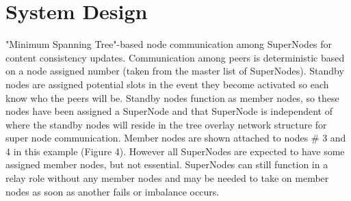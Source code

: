 \documentclass[oneside,12pt]{memoir}
\begin{document}
\section{System Design}
\label{sysd}

"Minimum Spanning Tree"-based node communication among SuperNodes for content consistency updates.  Communication among peers is deterministic based on a node assigned number (taken from the master list of SuperNodes).     Standby nodes are assigned potential slots in the event they become activated so each know who the peers will be.  Standby nodes function as member nodes, so these nodes have been assigned a SuperNode and that SuperNode is independent of where the standby nodes will reside in the tree overlay network structure for super node communication.  Member nodes are shown attached to nodes \# 3 and 4 in this example (Figure 4).  However all SuperNodes are expected to have some assigned member nodes, but not essential.  SuperNodes can still function in a relay role without any member nodes and may be needed to take on member nodes as soon as another fails or imbalance occurs. 
\end{document}
